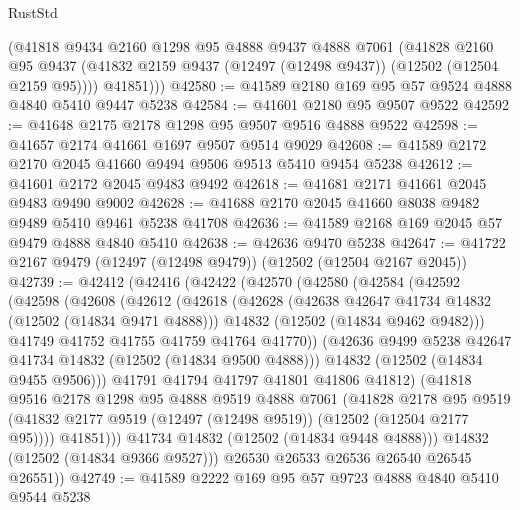 \begin{lexlean}{RustStd}
\begin{coremodule}
        (@41818
          @9434
          @2160
          @1298
          @95
          @4888
          @9437
          @4888
          @7061
          (@41828
            @2160
            @95
            @9437
            (@41832 @2159 @9437 (@12497 (@12498 @9437)) (@12502 (@12504 @2159 @95))))
          @41851)))
@42580 := @41589 @2180 @169 @95 @57 @9524 @4888 @4840 @5410 @9447 @5238
@42584 := @41601 @2180 @95 @9507 @9522
@42592 := @41648 @2175 @2178 @1298 @95 @9507 @9516 @4888 @9522
@42598 := @41657 @2174 @41661 @1697 @9507 @9514 @9029
@42608 := @41589 @2172 @2170 @2045 @41660 @9494 @9506 @9513 @5410 @9454 @5238
@42612 := @41601 @2172 @2045 @9483 @9492
@42618 := @41681 @2171 @41661 @2045 @9483 @9490 @9002
@42628 := @41688 @2170 @2045 @41660 @8038 @9482 @9489 @5410 @9461 @5238 @41708
@42636 := @41589 @2168 @169 @2045 @57 @9479 @4888 @4840 @5410
@42638 := @42636 @9470 @5238
@42647 := @41722 @2167 @9479 (@12497 (@12498 @9479)) (@12502 (@12504 @2167 @2045))
@42739 := @42412
    (@42416
      (@42422
        (@42570
          (@42580
            (@42584
              (@42592
                (@42598
                  (@42608
                    (@42612
                      (@42618
                        (@42628
                          (@42638 @42647 @41734 @14832 (@12502 (@14834 @9471 @4888)))
                          @14832
                          (@12502 (@14834 @9462 @9482)))
                        @41749
                        @41752
                        @41755
                        @41759
                        @41764
                        @41770))
                    (@42636 @9499 @5238 @42647 @41734 @14832 (@12502 (@14834 @9500 @4888)))
                    @14832
                    (@12502 (@14834 @9455 @9506)))
                  @41791
                  @41794
                  @41797
                  @41801
                  @41806
                  @41812)
                (@41818
                  @9516
                  @2178
                  @1298
                  @95
                  @4888
                  @9519
                  @4888
                  @7061
                  (@41828
                    @2178
                    @95
                    @9519
                    (@41832 @2177 @9519 (@12497 (@12498 @9519)) (@12502 (@12504 @2177 @95))))
                  @41851)))
            @41734
            @14832
            (@12502 (@14834 @9448 @4888)))
          @14832
          (@12502 (@14834 @9366 @9527)))
        @26530
        @26533
        @26536
        @26540
        @26545
        @26551))
@42749 := @41589 @2222 @169 @95 @57 @9723 @4888 @4840 @5410 @9544 @5238

\end{coremodule}
\end{lexlean}

